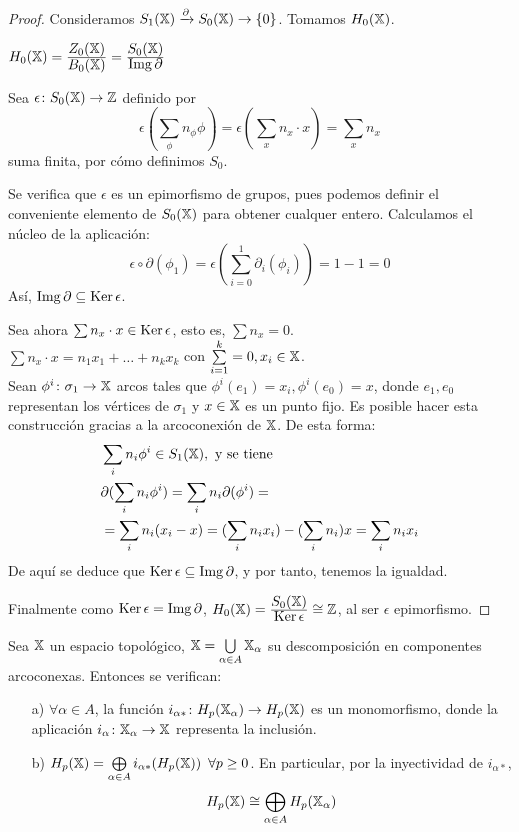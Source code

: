 \begin{proof}
  Consideramos $S_{1}({\mathbb X}) \xrightarrow{\partial} S_{0}({\mathbb X}) \to \{0\}$. Tomamos $H_0({\mathbb X})$.

  $H_0({\mathbb X}) = \frac{\displaystyle Z_0({\mathbb X})}{\displaystyle B_0({\mathbb X})} = \frac{\displaystyle S_0({\mathbb X})}{\displaystyle \operatorname{Img} \partial}$

  Sea $\epsilon \colon S_0({\mathbb X}) \to \mathbb{Z}$ definido por \[\epsilon(\sum\limits_{\phi} n_\phi \phi) = \epsilon(\sum\limits_{x} n_x \cdot x) = \sum\limits_{x} n_x \]
  suma finita, por cómo definimos $S_0$.

  Se verifica que $\epsilon$ es un epimorfismo de grupos, pues podemos definir el conveniente elemento de $S_0({\mathbb X})$ para obtener
  cualquer entero. Calculamos el núcleo de la aplicación:
  \[ \epsilon \circ \partial(\phi_1) = \epsilon(\sum_{i=0}^1 \partial_i(\phi_i)) = 1 - 1 = 0\]  Así, $\operatorname{Img} \partial \subseteq \operatorname{Ker} \epsilon$.

  Sea ahora $\sum n_x \cdot x \in \operatorname{Ker} \epsilon$, esto es, $\sum n_x = 0$. \\
  $\sum n_x \cdot x = n_1 x_1 + \dots + n_k x_k$ con $\sum\limits_{i=1}^k = 0, x_i \in {\mathbb X}$. \\
  Sean $\phi^i \colon \sigma_1 \to {\mathbb X}$ arcos tales que $\phi^i(e_1) = x_i, \phi^i(e_0) = x$,
  donde $e_1, e_0$ representan los vértices de $\sigma_1$ y $x \in {\mathbb X}$ es un punto fijo.
  Es posible hacer esta construcción gracias a la arcoconexión de ${\mathbb X}$. De esta forma:
  \begin{align*}
    &\sum_i n_i \phi^i \in S_{1}({\mathbb X}), \text{ y se tiene} \\
    &\partial(\sum_i n_i \phi^i) = \sum_i n_i \partial(\phi^i) =\\
    &= \sum_i n_i(x_i - x) = (\sum_i n_i x_i) - (\sum_i n_i) x = \sum_i n_i x_i
  \end{align*}
  De aquí se deduce que $\operatorname{Ker} \epsilon \subseteq \operatorname{Img} \partial$, y por tanto, tenemos la igualdad.

  Finalmente como $\operatorname{Ker} \epsilon = \operatorname{Img} \partial$, $H_0({\mathbb X}) = \frac{\displaystyle S_0({\mathbb X})}{\displaystyle \operatorname{Ker} \epsilon} \cong \mathbb{Z}$, al ser $\epsilon$ epimorfismo.
\end{proof}

\begin{proposition}
  Sea ${\mathbb X}$ un espacio topológico, ${\mathbb X} = \bigcup\limits_{\alpha \in A} {\mathbb X}_\alpha$ su descomposición en componentes arcoconexas. Entonces se verifican:
  \begin{itemize}
    \item[a)] $\forall \alpha \in A$, la función $i_{\alpha*} \colon H_p({\mathbb X}_\alpha) \to H_p({\mathbb X})$ es un monomorfismo, donde la aplicación
              $i_\alpha \colon {\mathbb X}_\alpha \to {\mathbb X}$ representa la inclusión.
    \item[b)] $H_p({\mathbb X}) = \bigoplus\limits_{\alpha \in A} i_{\alpha*}(H_p({\mathbb X})) \hspace{0.5em} \forall p \geq 0$. En particular, por la inyectividad de $i_{\alpha*}$,
              \[ H_p({\mathbb X}) \cong \bigoplus_{\alpha \in A} H_p({\mathbb X}_\alpha) \]
  \end{itemize}
\end{proposition}

